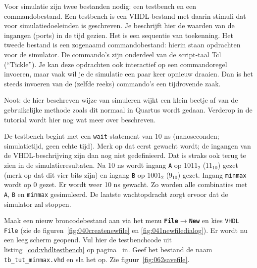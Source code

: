 \documentclass[a4paper,12pt,fleqn,twoside]{book}
\newcommand{\menu}[1]{\texttt{\textbf{#1}}}
\newcommand{\naam}[1]{\texttt{#1}}
\def\pijl{$\rightarrow$}%
\begin{document}
Voor simulatie zijn twee bestanden nodig: een testbench en een commandobestand.
Een testbench is een VHDL-bestand met daarin stimuli dat voor simulatiedoeleinden
is geschreven. Je beschrijft hier de waarden van de ingangen (ports) in de tijd
gezien. Het is een sequentie van toekenning. Het tweede bestand is een
zogenaamd commandobestand: hierin staan opdrachten voor de simulator. De
commando's zijn onderdeel van de script-taal Tcl (``Tickle''). Je kan
deze opdrachten ook interactief op een commandoregel invoeren, maar vaak wil
je de simulatie een paar keer opnieuw draaien. Dan is het steeds invoeren van
de (zelfde reeks) commando's een tijdrovende zaak.

Noot: de hier beschreven wijze van simuleren wijkt een klein beetje af van de
gebruikelijke methode zoals dit normaal in Quartus wordt gedaan. Verderop in de
tutorial wordt hier nog wat meer over beschreven.

De testbench begint met een \texttt{wait}-statement van 10 ns (nanoseconden;
simulatietijd, geen echte tijd). Merk op dat eerst gewacht wordt; de ingangen
van de VHDL-beschrijving zijn dan nog niet gedefinieerd. Dat is straks ook
terug te zien in de simulatieresultaten. Na 10 ns wordt ingang \texttt{A} op
1011$_2$ (11$_{10}$) gezet (merk op dat dit vier bits zijn) en ingang
\texttt{B} op 1001$_{2}$ (9$_{10}$) gezet. Ingang \texttt{minmax} wordt op 0
gezet. Er wordt weer 10 ns gewacht. Zo worden alle combinaties met \texttt{A},
\texttt{B} en \texttt{minmax} gesimuleerd. De laatste wachtopdracht zorgt
ervoor dat de simulator zal stoppen.

Maak een nieuw broncodebestand aan via het menu \menu{File\pijl{}New} en kies
\naam{VHDL File} (zie de figuren~\ref{fig:040createnewfile} en
\ref{fig:041newfiledialog}). Er wordt nu een leeg scherm geopend. Vul hier de
testbenchcode uit listing~\ref{cod:vhdltestbench} op
pagina~\pageref{cod:vhdltestbench} in. Geef het bestand de naam
\naam{tb\_tut\_minmax.vhd} en sla het op. Zie figuur~\ref{fig:062savefile}.
\end{document}
